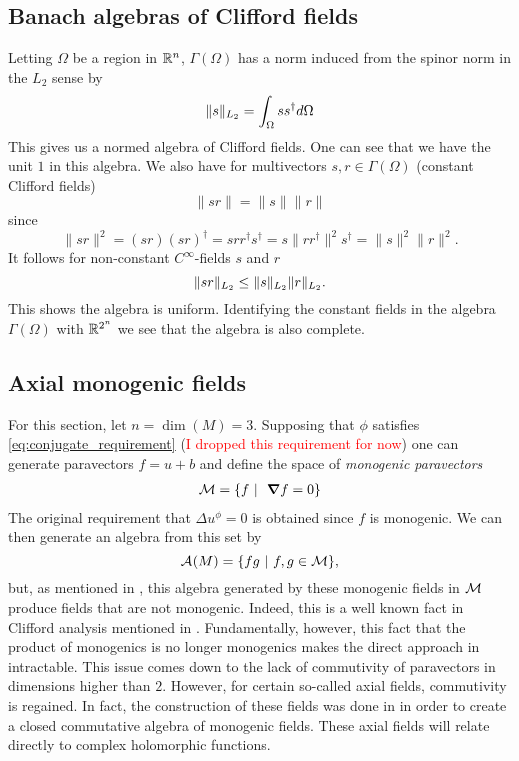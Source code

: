 \subsection{Banach algebras of Clifford fields}


Letting $\Omega$ be a region in $\mathbb{R}^n$, $\Gamma(\Omega)$ has a norm induced from the spinor norm in the $L_2$ sense by
\[
\|s\|_{L_2} = \int_\Omega ss^\dagger d\Omega
\]
This gives us a normed algebra of Clifford fields. One can see that we have the unit $1$ in this algebra. We also have for multivectors $s,r \in \Gamma(\Omega)$ (constant Clifford fields)
\[
\|sr\| = \|s\|\|r\|
\]
since
\[
\|sr\|^2 = (sr)(sr)^\dagger = srr^\dagger s^\dagger = s\|rr^\dagger\|^2 s^\dagger = \|s\|^2 \|r\|^2.
\]
It follows for non-constant $C^\infty$-fields $s$ and $r$
\[
\|sr\|_{L_2} \leq \|s\|_{L_2}\|r\|_{L_2}.
\]
This shows the algebra is uniform. Identifying the constant fields in the algebra $\Gamma(\Omega)$ with $\mathbb{R}^{2^n}$ we see that the algebra is also complete.


\subsection{Axial monogenic fields}

For this section, let $n=\dim(M)=3$. Supposing that $\phi$ satisfies \ref{eq:conjugate_requirement} (\textcolor{red}{I dropped this requirement for now}) one can generate paravectors $f=u+b$ and define the space of \emph{monogenic paravectors}
\begin{align*}
\mathcal{M} &= \{ f ~ \vert ~ ~\boldsymbol{\nabla} f=0\}\\
\end{align*}
The original requirement that $\Delta u^\phi =0$ is obtained since $f$ is monogenic. We can then generate an algebra from this set by
\[
\mathcal{A}_{}(M) = \{ fg ~\vert~ f,g \in \mathcal{M}\},
\]
but, as mentioned in \cite{belishev_algebras_2019}, this algebra generated by these monogenic fields in $\mathcal{M}$ produce fields that are not monogenic.  Indeed, this is a well known fact in Clifford analysis mentioned in \cite{schepper_introductory_nodate}.  Fundamentally, however, this fact that the product of monogenics is no longer monogenics makes the direct approach in \cite{belishev_calderon_2003} intractable. This issue comes down to the lack of commutivity of paravectors in dimensions higher than $2$.  However, for certain so-called axial fields, commutivity is regained. In fact, the construction of these fields was done in \cite{belishev_algebras_2017} in order to create a closed commutative algebra of monogenic fields. These axial fields will relate directly to complex holomorphic functions.

